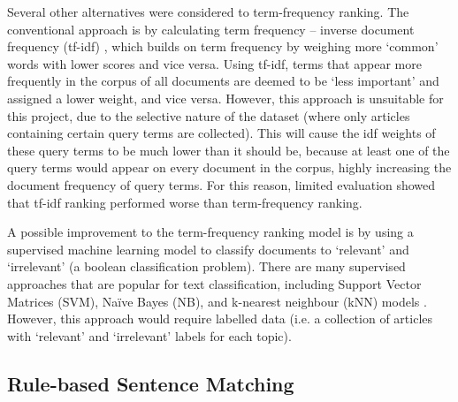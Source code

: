 \documentclass{report}
\begin{document}
Several other alternatives were considered to term-frequency ranking.
The conventional approach is by calculating term frequency -- inverse document frequency (tf-idf) \cite{robertson2004understanding, sparck1972statistical}, which builds on term frequency by weighing more `common' words with lower scores and vice versa.
Using tf-idf, terms that appear more frequently in the corpus of all documents are deemed to be `less important' and assigned a lower weight, and vice versa.
However, this approach is unsuitable for this project, due to the selective nature of the dataset (where only articles containing certain query terms are collected). 
This will cause the idf weights of these query terms to be much lower than it should be, because at least one of the query terms would appear on every document in the corpus, highly increasing the document frequency of query terms.
For this reason, limited evaluation showed that tf-idf ranking performed worse than term-frequency ranking.

A possible improvement to the term-frequency ranking model is by using a supervised machine learning model to classify documents to `relevant' and `irrelevant' (a boolean classification problem).
There are many supervised approaches that are popular for text classification, including Support Vector Matrices (SVM), Na\"{i}ve Bayes (NB), and k-nearest neighbour (kNN) models \cite{khan2010review}.
However, this approach would require labelled data (i.e. a collection of articles with `relevant' and `irrelevant' labels for each topic).

\subsection{Rule-based Sentence Matching} \label{des-matching}
\end{document}
